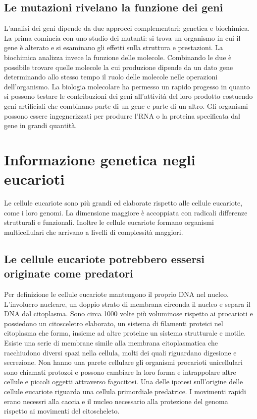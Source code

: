 \subsection{Le mutazioni rivelano la funzione dei geni}
L'analisi dei geni dipende da due approcci complementari: genetica e biochimica. La prima comincia con uno studio dei mutanti: si trova un organismo in cui il gene \`e alterato e si 
esaminano gli effetti sulla struttura e prestazioni. La biochimica analizza invece la funzione delle molecole. Combinando le due \`e possibile trovare quelle molecole la cui produzione
dipende da un dato gene determinando allo stesso tempo il ruolo delle molecole nelle operazioni dell'organismo. La biologia molecolare ha permesso un rapido progesso in quanto
si possono testare le contribuzioni dei geni all'attivit\`a del loro prodotto costuendo geni artificiali che combinano parte di un gene e parte di un altro. Gli organismi possono essere
ingegnerizzati per produrre l'RNA o la proteina specificata dal gene in grandi quantit\`a.
\section{Informazione genetica negli eucarioti}
Le cellule eucariote sono pi\`u grandi ed elaborate rispetto alle cellule eucariote, come i loro genomi. La dimensione maggiore \`e accoppiata con radicali differenze strutturali e
funzionali. Inoltre le cellule eucariote formano organismi multicellulari che arrivano a livelli di complessit\`a maggiori. 
\subsection{Le cellule eucariote potrebbero essersi originate come predatori}
Per definizione le cellule eucariote mantengono il proprio DNA nel nucleo. L'involucro nucleare, un doppio strato di membrana circonda il nucleo e separa il DNA dal citoplasma. Sono
circa 1000 volte pi\`u voluminose rispetto ai procarioti e possiedono un citosceletro elaborato, un sistema di filamenti proteici nel citoplasma che forma, insieme ad altre proteine
un sistema strutturale e motile. Esiste una serie di membrane simile alla membrana citoplasmatica che racchiudono diversi spazi nella cellula, molti dei quali riguardano digesione e
secrezione. Non hanno una parete cellulare gli organismi procarioti unicellulari sono chiamati protozoi e possono cambiare la loro forma e intrappolare altre cellule e piccoli oggetti
attraverso fagocitosi. Una delle ipotesi sull'origine delle cellule eucariote riguarda una cellula primordiale predatrice. I movimenti rapidi erano necessri alla caccia e il nucleo 
necessario alla protezione del genoma rispetto ai movimenti del citoscheleto.
